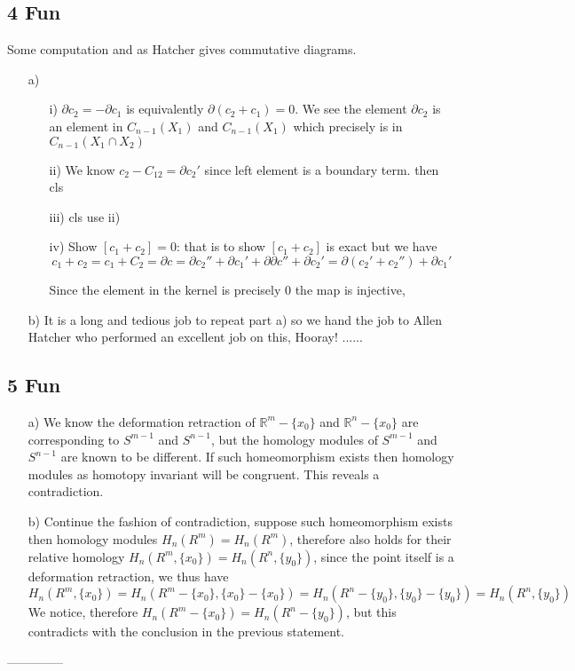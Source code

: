 \documentclass[11pt]{article}
\def\R{{\mathbb R}}
\def\p{\partial}
\theoremstyle{remark}
\begin{document}
\subsection*{4 Fun}
Some computation and as Hatcher gives commutative diagrams.
\begin{itemize}
\item[a)] 
    \begin{itemize}
        \item[i)] $\p{c_2}=-\p{c_1}$ is equivalently $\p{(c_2+c_1)}=0$. We see the element $\p{c_2}$ is an element in $C_{n-1}(X_1)$ and $C_{n-1}(X_1)$ which precisely is in $C_{n-1}(X_1\cap X_2)$
        \item[ii)] We know $c_2-C_{12}=\p c_2'$ since left element is a boundary term. then cls
        \item[iii)] cls use ii)
        \item[iv)] Show $[c_1+c_2]=0$: that is to show $[c_1+c_2]$ is exact but we have $$c_1+c_2=c_1+C_2=\p c= \p c_2''+\p c_1'+\p\p c''+\p c_2'=\p(c_2'+c_2'')+\p c_1'$$ 
        
         Since the element in the kernel is precisely $0$ the map is injective,
    \end{itemize}
    
\item[b)] It is a long and tedious job to repeat part a) so we hand the job to Allen Hatcher who performed an excellent job on this, Hooray! ......
\end{itemize}


\subsection*{5 Fun}
\begin{itemize}
    \item [a)] We know the deformation retraction of $\R^m-\{x_0\}$ and $\R^n-\{x_0\}$ are corresponding to $S^{m-1}$ and $S^{n-1}$, but the homology modules of $S^{m-1}$ and $S^{n-1}$ are known to be different. If such homeomorphism exists then homology modules as homotopy invariant will be congruent. This reveals a contradiction.
    
    \item [b)] Continue the fashion of contradiction, suppose such homeomorphism exists then homology modules $H_{n}(R^m)=H_{n}(R^m)$, therefore also holds for their relative homology  $H_{n}(R^m,\{x_0\})=H_{n}(R^n,\{y_0\})$, since the point itself is a deformation retraction, we thus have $$H_{n}(R^m,\{x_0\})=H_{n}(R^m-\{x_0\},\{x_0\}-\{x_0\})=H_{n}(R^n-\{y_0\},\{y_0\}-\{y_0\})=H_{n}(R^n,\{y_0\})$$ 
    We notice, therefore $H_{n}(R^m-\{x_0\})=H_{n}(R^n-\{y_0\})$, but this contradicts with the conclusion in the previous statement.
\end{itemize}

--------------
\end{document}
